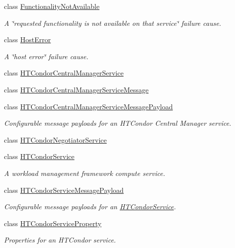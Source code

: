 \begin{DoxyCompactItemize}
class \hyperlink{classwrench_1_1_functionality_not_available}{Functionality\+Not\+Available}
\begin{DoxyCompactList}\small\item\em A \char`\"{}requested functionality is not available on that service\char`\"{} failure cause. \end{DoxyCompactList}\item 
class \hyperlink{classwrench_1_1_host_error}{Host\+Error}
\begin{DoxyCompactList}\small\item\em A \char`\"{}host error\char`\"{} failure cause. \end{DoxyCompactList}\item 
class \hyperlink{classwrench_1_1_h_t_condor_central_manager_service}{H\+T\+Condor\+Central\+Manager\+Service}
\item 
class \hyperlink{classwrench_1_1_h_t_condor_central_manager_service_message}{H\+T\+Condor\+Central\+Manager\+Service\+Message}
\item 
class \hyperlink{classwrench_1_1_h_t_condor_central_manager_service_message_payload}{H\+T\+Condor\+Central\+Manager\+Service\+Message\+Payload}
\begin{DoxyCompactList}\small\item\em Configurable message payloads for an H\+T\+Condor Central Manager service. \end{DoxyCompactList}\item 
class \hyperlink{classwrench_1_1_h_t_condor_negotiator_service}{H\+T\+Condor\+Negotiator\+Service}
\item 
class \hyperlink{classwrench_1_1_h_t_condor_service}{H\+T\+Condor\+Service}
\begin{DoxyCompactList}\small\item\em A workload management framework compute service. \end{DoxyCompactList}\item 
class \hyperlink{classwrench_1_1_h_t_condor_service_message_payload}{H\+T\+Condor\+Service\+Message\+Payload}
\begin{DoxyCompactList}\small\item\em Configurable message payloads for an \hyperlink{classwrench_1_1_h_t_condor_service}{H\+T\+Condor\+Service}. \end{DoxyCompactList}\item 
class \hyperlink{classwrench_1_1_h_t_condor_service_property}{H\+T\+Condor\+Service\+Property}
\begin{DoxyCompactList}\small\item\em Properties for an H\+T\+Condor service. \end{DoxyCompactList}\item 

\end{DoxyCompactItemize}
